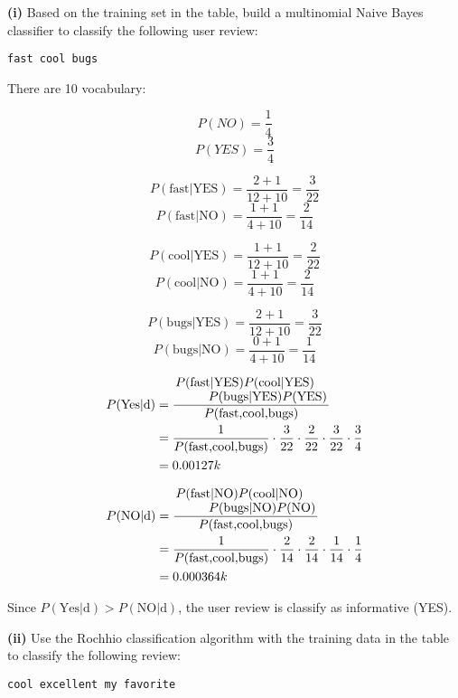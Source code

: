 \documentclass[11pt,a4paper]{report}
\begin{document}
\begin{multicols*}{2}
\noindent \textbf{(i)} Based on the training set in the table, build a multinomial Naive Bayes classifier to classify the following user review:
\begin{center}\verb|fast cool bugs|\end{center}

\noindent There are 10 vocabulary:

$$P(NO) = \frac{1}{4}$$
$$P(YES) = \frac{3}{4}$$

$$P(\text{fast}|\text{YES}) = \frac{2 + 1}{12 + 10} = \frac{3}{22}$$
$$P(\text{fast}|\text{NO}) = \frac{1 + 1}{4 + 10} = \frac{2}{14}$$

$$P(\text{cool}|\text{YES}) = \frac{1 + 1}{12 + 10} = \frac{2}{22}$$
$$P(\text{cool}|\text{NO}) = \frac{1 + 1}{4 + 10} = \frac{2}{14}$$

$$P(\text{bugs}|\text{YES}) = \frac{2 + 1}{12 + 10} = \frac{3}{22}$$
$$P(\text{bugs}|\text{NO}) = \frac{0 + 1}{4 + 10} = \frac{1}{14}$$

\begin{equation*}
\begin{split}
P(\text{Yes}|\text{d}) &= \frac{\splitfrac{P(\text{fast}|\text{YES})P(\text{cool}|\text{YES})}{P(\text{bugs}|\text{YES})P(\text{YES})}}{P(\text{fast,cool,bugs})}\\
&= \frac{1}{P(\text{fast,cool,bugs})} \cdot \frac{3}{22} \cdot \frac{2}{22} \cdot \frac{3}{22} \cdot \frac{3}{4}\\
&= 0.00127k
\end{split}
\end{equation*}

\begin{equation*}
\begin{split}
P(\text{NO}|\text{d}) &= \frac{\splitfrac{P(\text{fast}|\text{NO})P(\text{cool}|\text{NO})}{P(\text{bugs}|\text{NO})P(\text{NO})}}{P(\text{fast,cool,bugs})}\\
&= \frac{1}{P(\text{fast,cool,bugs})} \cdot \frac{2}{14} \cdot \frac{2}{14} \cdot \frac{1}{14} \cdot \frac{1}{4}\\
&= 0.000364k
\end{split}
\end{equation*}

\noindent Since $P(\text{Yes}|\text{d}) > P(\text{NO}|\text{d})$, the user review is classify as informative (YES). 

\noindent \textbf{(ii)} Use the Rochhio classification algorithm with the training data in the table to classify the following review:
\begin{center}\verb|cool excellent my favorite|\end{center}


\end{multicols*}
\end{document}
